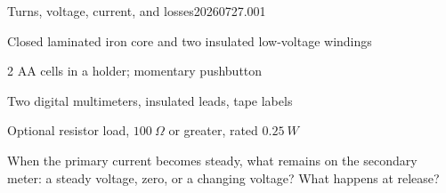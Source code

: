 

  {Turns, voltage, current, and losses}{20260727.001}

\newcommand{\coilpair}[2]{%
\begin{tikzpicture}[baseline=-.6ex,x=.16cm,y=.16cm,line cap=round]
  \draw[line width=1.8pt] (-1.5,-5) rectangle (8.5,5);
  \draw[line width=1.8pt] (1,-2.5) rectangle (6,2.5);
  \foreach \y in {-4,-2,...,4}
    \draw[line width=.65pt] (-2,\y) arc[start angle=270,end angle=90,x radius=1,y radius=1];
  \foreach \y in {-4.5,-3,...,4.5}
    \draw[line width=.65pt] (9,\y) arc[start angle=-90,end angle=90,x radius=1,y radius=.75];
  \node[font=\tiny] at (-3.6,0) {$N_p=#1$};
  \node[font=\tiny] at (10.7,0) {$N_s=#2$};
\end{tikzpicture}}


\rolecard

\begin{materials}
\item Closed laminated iron core and two insulated low-voltage windings
\item 2 AA cells in a holder; momentary pushbutton
\item Two digital multimeters, insulated leads, tape labels
\item Optional resistor load, \(\qty{100}{\Omega}\) or greater, rated \(\qty{0.25}{W}\)
\end{materials}

\begin{predict}
When the primary current becomes steady, what remains on the secondary meter:
a steady voltage, zero, or a changing voltage? What happens at release?
\end{predict}

